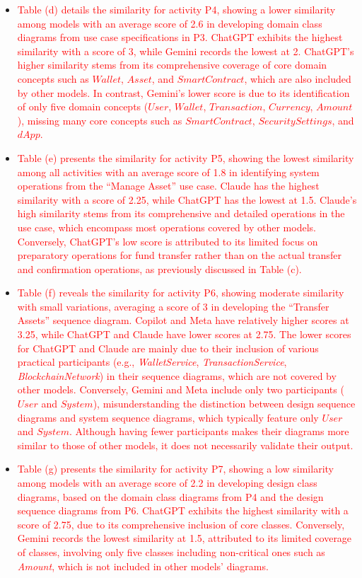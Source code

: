 \begin{itemize}
	\item \textcolor{red}{Table (d) details the similarity for activity P4, showing a lower similarity among models with an average score of 2.6 in developing domain class diagrams from use case specifications in P3. ChatGPT exhibits the highest similarity with a score of 3, while Gemini records the lowest at 2. ChatGPT's higher similarity stems from its comprehensive coverage of core domain concepts such as $Wallet$, $Asset$, and $SmartContract$, which are also included by other models. In contrast, Gemini's lower score is due to its identification of only five domain concepts ($User$, $Wallet$, $Transaction$, $Currency$, $Amount$), missing many core concepts such as $SmartContract$, $SecuritySettings$, and $dApp$.}
	
	\item \textcolor{red}{Table (e) presents the similarity for activity P5, showing the lowest similarity among all activities with an average score of 1.8 in identifying system operations from the ``Manage Asset'' use case. Claude has the highest similarity with a score of 2.25, while ChatGPT has the lowest at 1.5. Claude's high similarity stems from its comprehensive and detailed operations in the use case, which encompass most operations covered by other models. Conversely, ChatGPT's low score is attributed to its limited focus on preparatory operations for fund transfer rather than on the actual transfer and confirmation operations, as previously discussed in Table (c).}
	
	\item \textcolor{red}{Table (f) reveals the similarity for activity P6, showing moderate similarity with small variations, averaging a score of 3 in developing the ``Transfer Assets'' sequence diagram. Copilot and Meta have relatively higher scores at 3.25, while ChatGPT and Claude have lower scores at 2.75. The lower scores for ChatGPT and Claude are mainly due to their inclusion of various practical participants (e.g., \emph{WalletService}, \emph{TransactionService}, \emph{BlockchainNetwork}) in their sequence diagrams, which are not covered by other models. Conversely, Gemini and Meta include only two participants ($User$ and $System$), misunderstanding the distinction between design sequence diagrams and system sequence diagrams, which typically feature only $User$ and $System$. Although having fewer participants makes their diagrams more similar to those of other models, it does not necessarily validate their output.}
	
	\item \textcolor{red}{Table (g) presents the similarity for activity P7, showing a low similarity among models with an average score of 2.2 in developing design class diagrams, based on the domain class diagrams from P4 and the design sequence diagrams from P6. ChatGPT exhibits the highest similarity with a score of 2.75, due to its comprehensive inclusion of core classes. Conversely, Gemini records the lowest similarity at 1.5, attributed to its limited coverage of classes, involving only five classes including non-critical ones such as \emph{Amount}, which is not included in other models' diagrams.}
	

\end{itemize}
